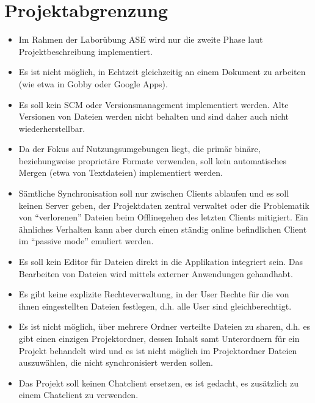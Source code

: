 
\section{Projektabgrenzung}
\begin{itemize}
  \item Im Rahmen der Laborübung ASE wird nur die zweite Phase laut Projektbeschreibung implementiert. 
  \item Es ist nicht möglich, in Echtzeit gleichzeitig an einem Dokument zu arbeiten (wie etwa in Gobby oder Google Apps).
  \item Es soll kein SCM oder Versionsmanagement implementiert werden. Alte Versionen von Dateien werden nicht behalten und sind daher auch nicht wiederherstellbar.
  \item Da der Fokus auf Nutzungsumgebungen liegt, die primär binäre, beziehungweise proprietäre Formate verwenden, soll kein automatisches Mergen (etwa von Textdateien) implementiert werden.
  \item Sämtliche Synchronisation soll nur zwischen Clients ablaufen und es soll keinen Server geben, der Projektdaten zentral verwaltet oder die Problematik von ``verlorenen'' Dateien beim Offlinegehen des letzten Clients mitigiert. Ein ähnliches Verhalten kann aber durch einen ständig online befindlichen Client im ``passive mode'' emuliert werden.
  \item Es soll kein Editor für Dateien direkt in die Applikation integriert sein. Das Bearbeiten von Dateien wird mittels externer Anwendungen gehandhabt.
  \item Es gibt keine explizite Rechteverwaltung, in der User Rechte für die von ihnen eingestellten Dateien festlegen, d.h. alle User sind gleichberechtigt.
  \item Es ist nicht möglich, über mehrere Ordner verteilte Dateien zu sharen, d.h. es gibt einen einzigen Projektordner, dessen Inhalt samt Unterordnern für ein Projekt behandelt wird und es ist nicht möglich im Projektordner Dateien auszuwählen, die nicht synchronisiert werden sollen.
  \item Das Projekt soll keinen Chatclient ersetzen, es ist gedacht, es zusätzlich zu einem Chatclient zu verwenden.
\end{itemize}

